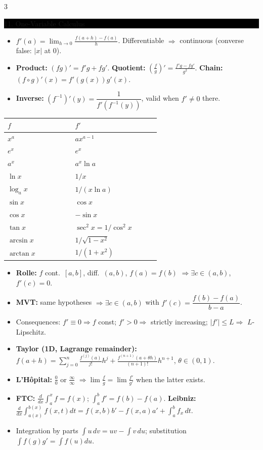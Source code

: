 \documentclass[8pt,letterpaper]{article}
\makeatletter
\newcommand{\sect}[1]{%
  \vspace{2.2pt}%
  \noindent\colorbox{black}{\parbox{\dimexpr\linewidth-2\fboxsep}{%
    \color{white}\bfseries\scshape\fontsize{6.4}{7.4}\selectfont
    \hyphenpenalty=10000\exhyphenpenalty=10000\raggedright #1}}%
  \vspace{1.4pt}\par\nopagebreak\@afterheading}
\newenvironment{tl}
  {\begin{itemize}[leftmargin=6pt,itemsep=0.3pt,topsep=1pt,parsep=0pt,
                   partopsep=0pt,label=\textcolor{gray}{\tiny$\bullet$}]}
  {\end{itemize}}
\makeatother
\begin{document}
\begin{multicols}{3}
\sect{11. One-Variable Calculus}
\begin{tl}
\item $f'(a)=\lim_{h\to0}\frac{f(a+h)-f(a)}{h}$. Differentiable $\Rightarrow$ continuous (converse false: $|x|$ at $0$).
\item \textbf{Product:} $(fg)'=f'g+fg'$. \textbf{Quotient:} $\left(\frac fg\right)'=\frac{f'g-fg'}{g^2}$. \textbf{Chain:} $(f\circ g)'(x)=f'(g(x))g'(x)$.
\item \textbf{Inverse:} $(f^{-1})'(y)=\dfrac{1}{f'(f^{-1}(y))}$, valid when $f'\ne0$ there.
\end{tl}
\begin{center}\fontsize{5.9}{6.9}\selectfont
\begin{tabular}{@{}p{0.30\linewidth}p{0.30\linewidth}@{}}
\hline
$f$ & $f'$\\ \hline
$x^a$ & $ax^{a-1}$\\
$e^x$ & $e^x$\\
$a^x$ & $a^x\ln a$\\
$\ln x$ & $1/x$\\
$\log_a x$ & $1/(x\ln a)$\\
$\sin x$ & $\cos x$\\
$\cos x$ & $-\sin x$\\
$\tan x$ & $\sec^2x=1/\cos^2x$\\
$\arcsin x$ & $1/\sqrt{1-x^2}$\\
$\arctan x$ & $1/(1+x^2)$\\ \hline
\end{tabular}
\end{center}
\begin{tl}
\item \textbf{Rolle:} $f$ cont.\ $[a,b]$, diff.\ $(a,b)$, $f(a)=f(b)$ $\Rightarrow\exists c\in(a,b)$, $f'(c)=0$.
\item \textbf{MVT:} same hypotheses $\Rightarrow\exists c\in(a,b)$ with $f'(c)=\dfrac{f(b)-f(a)}{b-a}$.
\item Consequences: $f'\equiv0\Rightarrow f$ const; $f'>0\Rightarrow$ strictly increasing; $|f'|\le L\Rightarrow$ $L$-Lipschitz.
\item \textbf{Taylor (1D, Lagrange remainder):} $f(a+h)=\sum_{j=0}^{n}\frac{f^{(j)}(a)}{j!}h^j+\frac{f^{(n+1)}(a+\theta h)}{(n+1)!}h^{n+1}$, $\theta\in(0,1)$.
\item \textbf{L'H\^opital:} $\frac00$ or $\frac\infty\infty$ $\Rightarrow\lim\frac fg=\lim\frac{f'}{g'}$ when the latter exists.
\item \textbf{FTC:} $\frac{d}{dx}\int_a^xf=f(x)$; $\int_a^bf'=f(b)-f(a)$. \textbf{Leibniz:} $\frac{d}{dx}\int_{a(x)}^{b(x)}f(x,t)dt=f(x,b)b'-f(x,a)a'+\int_a^b f_x\,dt$.
\item Integration by parts $\int u\,dv=uv-\int v\,du$; substitution $\int f(g)g'=\int f(u)du$.
\end{tl}


\end{multicols}
\end{document}
